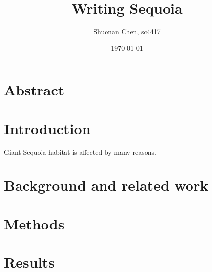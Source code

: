 \documentclass{article}
\begin{document}
\title{Writing Sequoia}
\date{\today}
\author{Shuonan Chen, sc4417}

\maketitle

\section{Abstract}

\section{Introduction}
Giant Sequoia habitat is affected by many reasons. 


\section{Background and related work}

\section{Methods}


\section{Results}


% 
\end{document}

